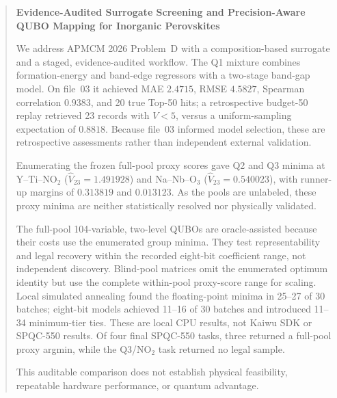 \documentclass{apmcmthesis}
\begin{document}
\pagestyle{frontmatterstyle}
\begin{abstract}
\begin{center}
\Large\bfseries Evidence-Audited Surrogate Screening and Precision-Aware
QUBO Mapping for Inorganic Perovskites
\end{center}

We address APMCM 2026 Problem~D with a composition-based surrogate and a
staged, evidence-audited workflow.  The Q1 mixture combines formation-energy
and band-edge regressors with a two-stage band-gap model.  On file~03 it
achieved MAE $2.4715$, RMSE $4.5827$, Spearman correlation $0.9383$, and 20
true Top-50 hits; a retrospective budget-50 replay retrieved 23 records with
$V<5$, versus a uniform-sampling expectation of $0.8818$.  Because file~03
informed model selection, these are retrospective assessments rather than
independent external validation.

Enumerating the frozen full-pool proxy scores gave Q2 and Q3 minima at
Y--Ti--$\mathrm{NO}_2$ ($\widehat V_{23}=1.491928$) and
Na--Nb--$\mathrm O_3$ ($\widehat V_{23}=0.540023$), with runner-up margins
of $0.313819$ and $0.013123$.  As the pools are unlabeled, these proxy
minima are neither statistically resolved nor physically validated.

The full-pool 104-variable, two-level QUBOs are oracle-assisted because their
costs use the enumerated group minima.  They test representability and legal
recovery within the recorded eight-bit coefficient range, not independent
discovery.  Blind-pool matrices omit the enumerated optimum identity but use
the complete within-pool proxy-score range for scaling.  Local simulated
annealing found the floating-point minima in 25--27 of 30 batches; eight-bit
models achieved 11--16 of 30 batches and introduced 11--34
minimum-tier ties.  These are local CPU results, not Kaiwu SDK or SPQC-550
results.  Of four final SPQC-550 tasks, three returned a full-pool proxy
argmin, while the Q3/$\mathrm{NO}_2$ task returned no legal sample.

This auditable comparison does not establish physical feasibility,
repeatable hardware performance, or quantum advantage.

\end{abstract}

\newpage
\tableofcontents

\newpage
\pagestyle{mainmatterstyle}
\setcounter{page}{1}















\end{document}
